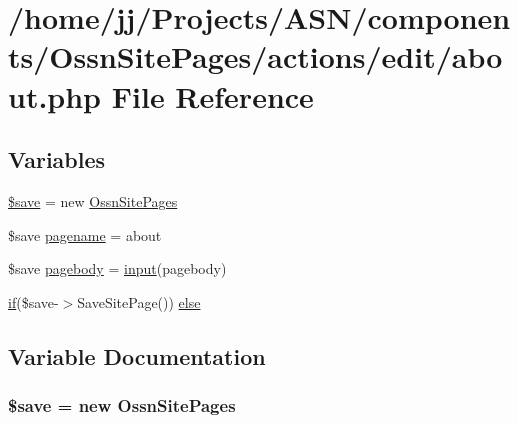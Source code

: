 \hypertarget{_ossn_site_pages_2actions_2edit_2about_8php}{}\section{/home/jj/\+Projects/\+A\+S\+N/components/\+Ossn\+Site\+Pages/actions/edit/about.php File Reference}
\label{_ossn_site_pages_2actions_2edit_2about_8php}
\subsection*{Variables}
\begin{DoxyCompactItemize}
\item 
\hyperlink{_ossn_site_pages_2actions_2edit_2about_8php_a00e6dff44e00c36820da5508c6d9aba3}{\$save} = new \hyperlink{class_ossn_site_pages}{Ossn\+Site\+Pages}
\item 
\$save \hyperlink{_ossn_site_pages_2actions_2edit_2about_8php_a80628cda62ee6fb56006a1a49ea33304}{pagename} = \textquotesingle{}about\textquotesingle{}
\item 
\$save \hyperlink{_ossn_site_pages_2actions_2edit_2about_8php_ac5e77655d4436fc87c23b803e772f55b}{pagebody} = \hyperlink{ossn_8lib_8input_8php_a64ebee98b041c4f75f71ed3cd73cc8ed}{input}(\textquotesingle{}pagebody\textquotesingle{})
\item 
\hyperlink{jquery_8tokeninput_8js_ad8dd46a3cbc004569e34401e9e71771a}{if}(\$save-\/$>$Save\+Site\+Page()) \hyperlink{_ossn_site_pages_2actions_2edit_2about_8php_a3652d10f06e3bfc8edd1455fd0c357ae}{else}
\end{DoxyCompactItemize}


\subsection{Variable Documentation}
\subsubsection[{\texorpdfstring{\$save}{$save}}]{\setlength{\rightskip}{0pt plus 5cm}\$save = new {\bf Ossn\+Site\+Pages}}\hypertarget{_ossn_site_pages_2actions_2edit_2about_8php_a00e6dff44e00c36820da5508c6d9aba3}{}\label{_ossn_site_pages_2actions_2edit_2about_8php_a00e6dff44e00c36820da5508c6d9aba3}


